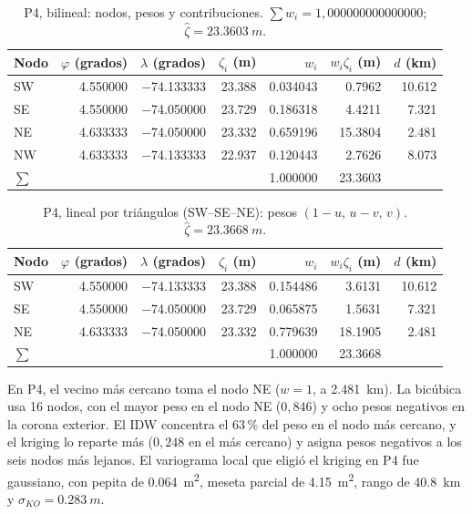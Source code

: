 \documentclass[11pt,letterpaper]{article}
\begin{document}
\begin{table}[H]
\centering
\caption{P4, bilineal: nodos, pesos y contribuciones. $\sum w_i=1{,}000000000000000$; $\hat\zeta=\SI{23.3603}{m}$.}
\label{tab:nodos_bil}
\small
\begin{tabular}{@{}lrrrrrr@{}}
\toprule
Nodo & $\varphi$ (grados) & $\lambda$ (grados) & $\zeta_i$ (m) & $w_i$ & $w_i\zeta_i$ (m) & $d$ (km) \\
\midrule
SW & \num{4.550000} & \num{-74.133333} & \num{23.388} & \num{0.034043} & \num{0.7962} & \num{10.612} \\
SE & \num{4.550000} & \num{-74.050000} & \num{23.729} & \num{0.186318} & \num{4.4211} & \num{7.321} \\
NE & \num{4.633333} & \num{-74.050000} & \num{23.332} & \num{0.659196} & \num{15.3804} & \num{2.481} \\
NW & \num{4.633333} & \num{-74.133333} & \num{22.937} & \num{0.120443} & \num{2.7626} & \num{8.073} \\
\midrule
$\sum$ & & & & \num{1.000000} & \num{23.3603} & \\
\bottomrule
\end{tabular}
\end{table}

\begin{table}[H]
\centering
\caption{P4, lineal por triángulos (SW--SE--NE): pesos $(1-u,\,u-v,\,v)$. $\hat\zeta=\SI{23.3668}{m}$.}
\label{tab:nodos_tri}
\small
\begin{tabular}{@{}lrrrrrr@{}}
\toprule
Nodo & $\varphi$ (grados) & $\lambda$ (grados) & $\zeta_i$ (m) & $w_i$ & $w_i\zeta_i$ (m) & $d$ (km) \\
\midrule
SW & \num{4.550000} & \num{-74.133333} & \num{23.388} & \num{0.154486} & \num{3.6131} & \num{10.612} \\
SE & \num{4.550000} & \num{-74.050000} & \num{23.729} & \num{0.065875} & \num{1.5631} & \num{7.321} \\
NE & \num{4.633333} & \num{-74.050000} & \num{23.332} & \num{0.779639} & \num{18.1905} & \num{2.481} \\
\midrule
$\sum$ & & & & \num{1.000000} & \num{23.3668} & \\
\bottomrule
\end{tabular}
\end{table}

En P4, el vecino más cercano toma el nodo NE ($w=1$, a \SI{2.481}{km}). La bicúbica usa
16 nodos, con el mayor peso en el nodo NE ($0{,}846$) y ocho pesos negativos en la corona
exterior. El IDW concentra el 63\,\% del peso en el nodo más cercano, y el kriging lo
reparte más ($0{,}248$ en el más cercano) y asigna pesos negativos a los seis nodos más
lejanos. El variograma local que eligió el kriging en P4 fue gaussiano, con pepita de
\SI{0.064}{m^2}, meseta parcial de \SI{4.15}{m^2}, rango de \SI{40.8}{km} y
$\sigma_{KO}=\SI{0.283}{m}$.
\end{document}
